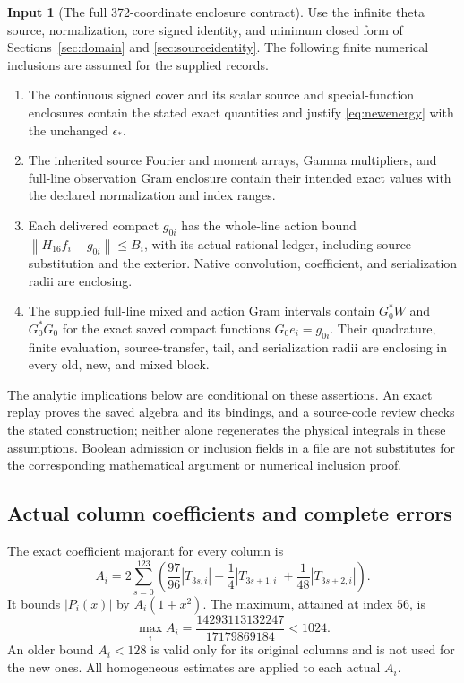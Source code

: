\documentclass[11pt,a4paper]{article}
\numberwithin{equation}{section}
\theoremstyle{definition}\newtheorem{definition}[theorem]{Definition}
\newtheorem{hypothesis}[theorem]{Input}
\theoremstyle{remark}\newtheorem{remark}[theorem]{Remark}
\newcommand{\norm}[1]{\left\|#1\right\|}
\begin{document}
\begin{hypothesis}[The full 372-coordinate enclosure contract]\label{inp:full64}
Use the infinite theta source, normalization, core signed identity, and minimum closed form of Sections~\ref{sec:domain} and \ref{sec:sourceidentity}. The following finite numerical inclusions are assumed for the supplied records.
\begin{enumerate}[label=(\roman*),leftmargin=2em]
\item The continuous signed cover and its scalar source and special-function enclosures contain the stated exact quantities and justify \eqref{eq:newenergy} with the unchanged $\epsilon_*$.
\item The inherited source Fourier and moment arrays, Gamma multipliers, and full-line observation Gram enclosure contain their intended exact values with the declared normalization and index ranges.
\item Each delivered compact $g_{0i}$ has the whole-line action bound $\norm{H_{16}f_i-g_{0i}}\le B_i$, with its actual rational ledger, including source substitution and the exterior. Native convolution, coefficient, and serialization radii are enclosing.
\item The supplied full-line mixed and action Gram intervals contain $G_0^*W$ and $G_0^*G_0$ for the exact saved compact functions $G_0e_i=g_{0i}$. Their quadrature, finite evaluation, source-transfer, tail, and serialization radii are enclosing in every old, new, and mixed block.
\end{enumerate}
The analytic implications below are conditional on these assertions. An exact replay proves the saved algebra and its bindings, and a source-code review checks the stated construction; neither alone regenerates the physical integrals in these assumptions. Boolean admission or inclusion fields in a file are not substitutes for the corresponding mathematical argument or numerical inclusion proof.
\end{hypothesis}

\subsection{Actual column coefficients and complete errors}
The exact coefficient majorant for every column is
\begin{equation}\label{eq:Ai64}
 A_i=2\sum_{s=0}^{123}\left(
 \frac{97}{96}|T_{3s,i}|+\frac14|T_{3s+1,i}|+
 \frac1{48}|T_{3s+2,i}|\right).
\end{equation}
It bounds $|P_i(x)|$ by $A_i(1+x^2)$. The maximum, attained at index $56$, is
\[
 \max_iA_i=\frac{14293113132247}{17179869184}<1024.
\]
An older bound $A_i<128$ is valid only for its original columns and is not used for the new ones. All homogeneous estimates are applied to each actual $A_i$.
\end{document}
